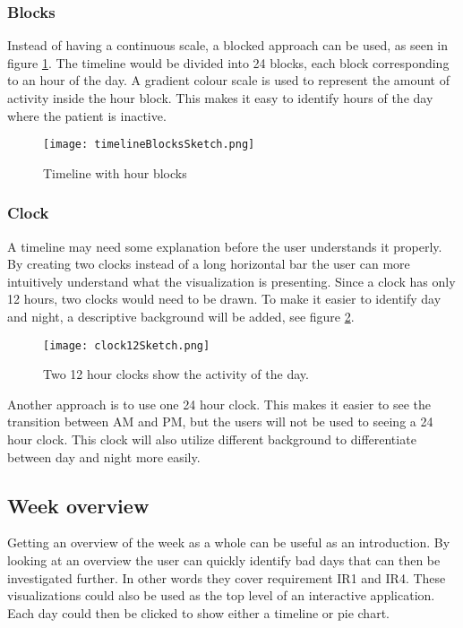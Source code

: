 \subsubsection{Blocks}
Instead of having a continuous scale, a blocked approach can be used, as seen in figure \ref{fig:timelineBlocks}. The timeline would be divided into 24 blocks, each block corresponding to an hour of the day. A gradient colour scale is used to represent the amount of activity inside the hour block. This makes it easy to identify hours of the day where the patient is inactive. 

\begin{figure}[h!]
	\centering
		\texttt{[image: timelineBlocksSketch.png]}
		\caption{\footnotesize Timeline with hour blocks}
		\label{fig:timelineBlocks}
\end{figure}

\subsubsection{Clock}
A timeline may need some explanation before the user understands it properly. By creating two clocks instead of a long horizontal bar the user can more intuitively understand what the visualization is presenting. Since a clock has only 12 hours, two clocks would need to be drawn. To make it easier to identify day and night, a descriptive background will be added, see figure \ref{fig:clock12}.

\begin{figure}[h!]
	\centering
		\texttt{[image: clock12Sketch.png]}
		\caption{\footnotesize Two 12 hour clocks show the activity of the day.}
		\label{fig:clock12}
\end{figure}

Another approach is to use one 24 hour clock. This makes it easier to see the transition between AM and PM, but the users will not be used to seeing a 24 hour clock. This clock will also utilize different background to differentiate between day and night more easily.

\subsection{Week overview}
Getting an overview of the week as a whole can be useful as an introduction. By looking at an overview the user can quickly identify bad days that can then be investigated further. In other words they cover requirement IR1 and IR4. These visualizations could also be used as the top level of an interactive application. Each day could then be clicked to show either a timeline or pie chart.

